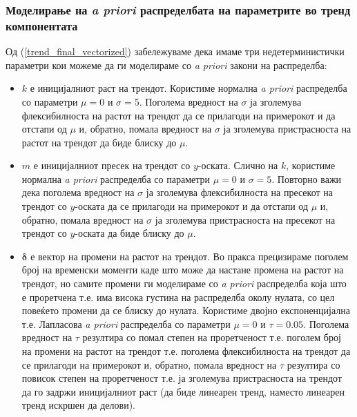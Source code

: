 \documentclass[12pt]{article}
\numberwithin{equation}{section}
\begin{document}
\subsubsection{Моделирање на \textit{a priori} распределбата на параметрите во тренд компонентата}

Од (\ref{trend_final_vectorized}) забележуваме дека имаме три недетерминистички параметри кои можеме да ги моделираме со \textit{a priori} закони на распределба:

\begin{itemize}
    \item \(k\) е иницијалниот раст на трендот. Користиме нормална \textit{a priori} распределба со параметри \(\mu = 0\) и \(\sigma = 5\). Поголема вредност на \(\sigma\) ја зголемува флексибилноста на растот на трендот да се прилагоди на примерокот и да отстапи од \(\mu\) и, обратно, помала вредност на \(\sigma\) ја зголемува пристрасноста на растот на трендот да биде блиску до \(\mu\).
    \item \(m\) е иницијалниот пресек на трендот со \(y\)-оската. Слично на \(k\), користиме нормална \textit{a priori} распределба со параметри \(\mu = 0\) и \(\sigma = 5\). Повторно важи дека поголема вредност на \(\sigma\) ја зголемува флексибилноста на пресекот на трендот со \(y\)-оската да се прилагоди на примерокот и да отстапи од \(\mu\) и, обратно, помала вредност на \(\sigma\) ја зголемува пристрасноста на пресекот на трендот со \(y\)-оската да биде блиску до \(\mu\).
    \item \(\boldsymbol{\delta}\) е вектор на промени на растот на трендот. Во пракса прецизираме поголем број на временски моменти каде што може да настане промена на растот на трендот, но самите промени ги моделираме со \textit{a priori} распределба која што е проретчена т.е. има висока густина на распределба околу нулата, со цел повеќето промени да се блиску до нулата. Користиме двојно експоненцијална т.е. Лапласова \textit{a priori} распределба со параметри \(\mu = 0\) и \(\tau = 0.05\). Поголема вредност на \(\tau\) резултира со помал степен на проретченост т.е. поголем број на промени на растот на трендот т.е. поголема флексибилноста на трендот да се прилагоди на примерокот и, обратно, помала вредност на \(\tau\) резултира со повисок степен на проретченост т.е. ја зголемува пристрасноста на трендот да го задржи иницијалниот раст (да биде линеарен тренд, наместо линеарен тренд искршен да делови).
\end{itemize}
\end{document}
